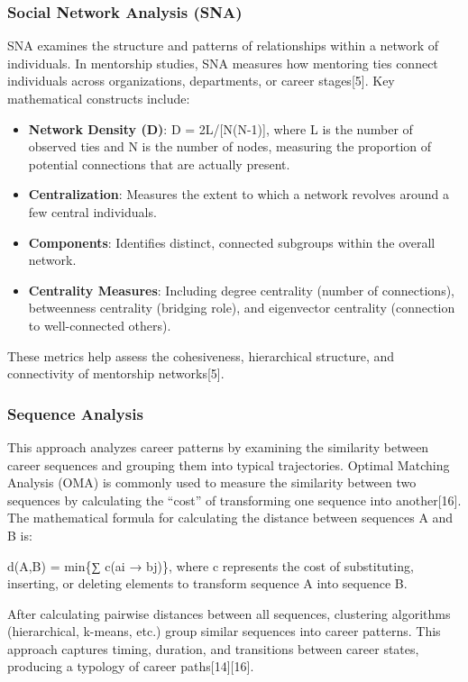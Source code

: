 \documentclass[
  letterpaper,
  DIV=11,
  numbers=noendperiod]{scrartcl}
\providecommand{\tightlist}{%
  \setlength{\itemsep}{0pt}\setlength{\parskip}{0pt}}
\begin{document}
\subsubsection{Social Network Analysis
(SNA)}\label{social-network-analysis-sna}

SNA examines the structure and patterns of relationships within a
network of individuals. In mentorship studies, SNA measures how
mentoring ties connect individuals across organizations, departments, or
career stages{[}5{]}. Key mathematical constructs include:

\begin{itemize}
\tightlist
\item
  \textbf{Network Density (D)}: D = 2L/{[}N(N-1){]}, where L is the
  number of observed ties and N is the number of nodes, measuring the
  proportion of potential connections that are actually present.
\item
  \textbf{Centralization}: Measures the extent to which a network
  revolves around a few central individuals.
\item
  \textbf{Components}: Identifies distinct, connected subgroups within
  the overall network.
\item
  \textbf{Centrality Measures}: Including degree centrality (number of
  connections), betweenness centrality (bridging role), and eigenvector
  centrality (connection to well-connected others).
\end{itemize}

These metrics help assess the cohesiveness, hierarchical structure, and
connectivity of mentorship networks{[}5{]}.

\subsubsection{Sequence Analysis}\label{sequence-analysis}

This approach analyzes career patterns by examining the similarity
between career sequences and grouping them into typical trajectories.
Optimal Matching Analysis (OMA) is commonly used to measure the
similarity between two sequences by calculating the ``cost'' of
transforming one sequence into another{[}16{]}. The mathematical formula
for calculating the distance between sequences A and B is:

d(A,B) = min\{∑ c(ai → bj)\}, where c represents the cost of
substituting, inserting, or deleting elements to transform sequence A
into sequence B.

After calculating pairwise distances between all sequences, clustering
algorithms (hierarchical, k-means, etc.) group similar sequences into
career patterns. This approach captures timing, duration, and
transitions between career states, producing a typology of career
paths{[}14{]}{[}16{]}.
\end{document}
